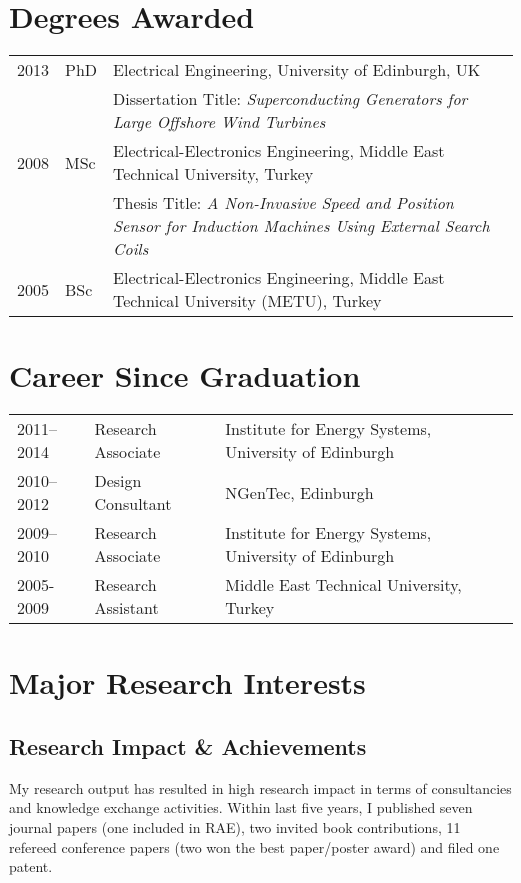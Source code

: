 \documentclass[a4paper,12pt]{article}
\begin{document}
\maketitle
 
\section{Degrees Awarded}
\begin{tabular}{llp{14cm}}
 2013 & PhD & Electrical Engineering, University of Edinburgh, UK\\  
& & Dissertation Title: \textit{Superconducting Generators for Large Offshore Wind Turbines} \\ 
 2008 & MSc & Electrical-Electronics Engineering, Middle East Technical University, Turkey \\
& & Thesis Title: \textit{A Non-Invasive Speed and Position Sensor for Induction Machines Using External Search Coils}\\
 2005 & BSc & Electrical-Electronics Engineering, Middle East Technical University (METU), Turkey \\

\end{tabular}

\section{Career Since Graduation}

\begin{tabular}{lp{3.6cm}l}
2011--2014 & Research Associate & Institute for Energy Systems, University of Edinburgh \\ 
2010--2012 & Design Consultant & NGenTec, Edinburgh\\
2009--2010 & Research Associate & Institute for Energy Systems, University of Edinburgh\\
2005-2009 & Research Assistant & Middle East Technical University, Turkey\\ 
\end{tabular}


\section{Major Research Interests}

\subsection{Research Impact \& Achievements}
My research output has resulted in high research impact in terms of consultancies and knowledge exchange activities. Within last five years, I published seven journal papers (one included in RAE), two invited book contributions, 11 refereed conference papers (two won the best paper/poster award) and filed one patent. 
\end{document}

